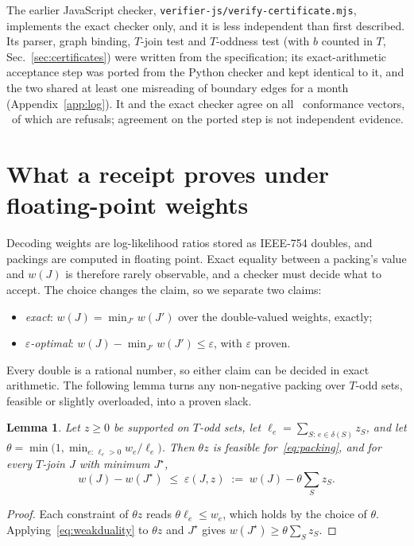 \documentclass[aps,pra,twocolumn,superscriptaddress,nofootinbib,longbibliography,floatfix]{revtex4-2}
\newtheorem{lemma}{Lemma}
\newcommand{\eps}{\varepsilon}
\newcommand{\T}{T}
\newcommand{\delt}{\delta}
\begin{document}
The earlier JavaScript checker, \nolinkurl{verifier-js/verify-certificate.mjs}, implements the exact checker only, and it is less independent than first described. Its parser, graph binding, $\T$-join test and $\T$-oddness test (with $b$ counted in $\T$, Sec.~\ref{sec:certificates}) were written from the specification; its exact-arithmetic acceptance step was ported from the Python checker and kept identical to it, and the two shared at least one misreading of boundary edges for a month (Appendix~\ref{app:log}). It and the exact checker agree on all \ConfVectors\ conformance vectors, \ConfRefusals\ of which are refusals; agreement on the ported step is not independent evidence.

\section{What a receipt proves under floating-point weights}
\label{sec:semantics}

Decoding weights are log-likelihood ratios stored as IEEE-754 doubles, and packings are computed in floating point. Exact equality between a packing's value and $w(J)$ is therefore rarely observable, and a checker must decide what to accept. The choice changes the claim, so we separate two claims:
\begin{itemize}
\item \emph{exact}: $w(J)=\min_{J'} w(J')$ over the double-valued weights, exactly;
\item \emph{$\eps$-optimal}: $w(J)-\min_{J'} w(J')\le\eps$, with $\eps$ proven.
\end{itemize}
Every double is a rational number, so either claim can be decided in exact arithmetic. The following lemma turns any non-negative packing over $\T$-odd sets, feasible or slightly overloaded, into a proven slack.

\begin{lemma}
Let $z\ge0$ be supported on $\T$-odd sets, let $\ell_e=\sum_{S:\,e\in\delt(S)}z_S$, and let $\theta=\min\bigl(1,\min_{e:\,\ell_e>0} w_e/\ell_e\bigr)$. Then $\theta z$ is feasible for~\eqref{eq:packing}, and for every $\T$-join $J$ with minimum $J^\star$,
\[
w(J)-w(J^\star)\;\le\;\eps(J,z)\;:=\;w(J)-\theta\sum_S z_S .
\]
\end{lemma}
\begin{proof}
Each constraint of $\theta z$ reads $\theta\ell_e\le w_e$, which holds by the choice of $\theta$. Applying~\eqref{eq:weakduality} to $\theta z$ and $J^\star$ gives $w(J^\star)\ge\theta\sum_S z_S$.
\end{proof}
\end{document}

